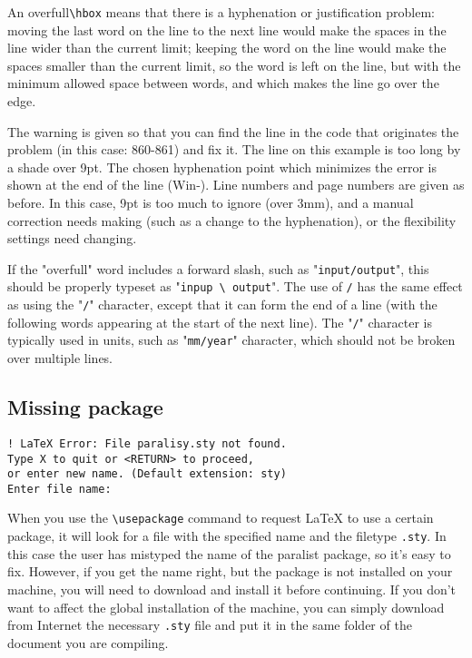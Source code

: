 An overfull\verb|\hbox| means that there is a hyphenation or justification
problem: moving the last word on the line to the next line would make the
spaces in the line wider than the current limit; keeping the word on the line
would make the spaces smaller than the current limit, so the word is left on
the line, but with the minimum allowed space between words, and which makes the
line go over the edge.

The warning is given so that you can find the line in the code that originates
the problem (in this case: 860-861) and fix it. The line on this example is too
long by a shade over 9pt. The chosen hyphenation point which minimizes the
error is shown at the end of the line (Win-). Line numbers and page numbers are
given as before. In this case, 9pt is too much to ignore (over 3mm), and a
manual correction needs making (such as a change to the hyphenation), or the
flexibility settings need changing.

If the "overfull" word includes a forward slash, such as "\verb|input/output|",
this should be properly typeset as "\verb|inpup \ output|".
The use of \verb|/| has the same effect as using the
"\verb|/|" character, except that it can form the end of a line (with
the following words appearing at the start of the next line). The
"\verb|/|" character is typically used in units, such as
"\verb|mm/year|" character, which should not be broken over multiple
lines.

\subsection{Missing package}
\begin{verbatim}
! LaTeX Error: File paralisy.sty not found.
Type X to quit or <RETURN> to proceed,
or enter new name. (Default extension: sty)
Enter file name:

\end{verbatim}

When you use the \verb|\usepackage| command to request LaTeX to use a certain
package, it will look for a file with the specified name and the filetype
\verb|.sty|. In this case the user has mistyped the name of the paralist
package, so it's easy to fix. However, if you get the name right, but the
package is not installed on your machine, you will need to download and install
it before continuing. If you don't want to affect the global installation of
the machine, you can simply download from Internet the necessary \verb|.sty|
file and put it in the same folder of the document you are compiling.

